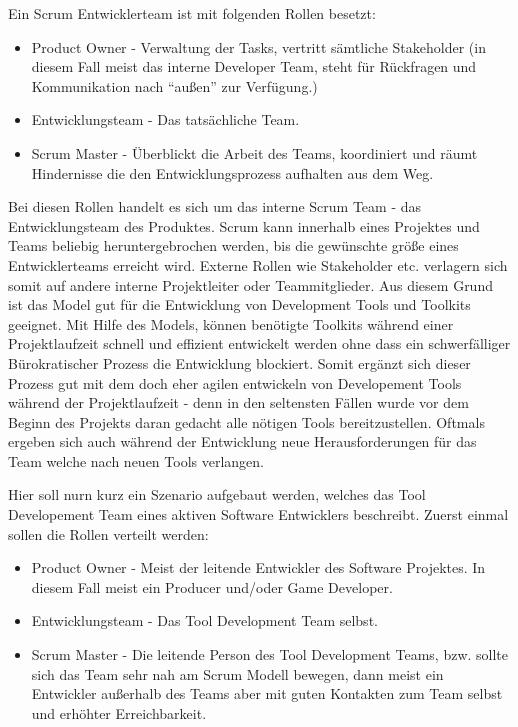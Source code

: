 \documentclass[pagesize, paper=a4, fontsize=12pt, titlepage=true, headings=small, headnosepline, abstractoff, liststotoc, nochapterprefix, plainheadsepline, twoside]{scrreprt}
\begin{document}
Ein Scrum Entwicklerteam ist mit folgenden Rollen besetzt:
\begin{itemize}
\item Product Owner - Verwaltung der Tasks, vertritt sämtliche Stakeholder (in diesem Fall meist das interne Developer Team, steht für Rückfragen und Kommunikation nach “außen” zur Verfügung.)
\item Entwicklungsteam - Das tatsächliche Team.
\item Scrum Master - Überblickt die Arbeit des Teams, koordiniert und räumt Hindernisse die den Entwicklungsprozess aufhalten aus dem Weg.
\end{itemize}

Bei diesen Rollen handelt es sich um das interne Scrum Team - das Entwicklungsteam des Produktes. Scrum kann innerhalb eines Projektes und Teams beliebig heruntergebrochen werden, bis die gewünschte größe eines Entwicklerteams erreicht wird. Externe Rollen wie Stakeholder etc. verlagern sich somit auf andere interne Projektleiter oder Teammitglieder. Aus diesem Grund ist das Model gut für die Entwicklung von Development Tools und Toolkits geeignet. Mit Hilfe des Models, können benötigte Toolkits während einer Projektlaufzeit schnell und effizient entwickelt werden ohne dass ein schwerfälliger Bürokratischer Prozess die Entwicklung blockiert. Somit ergänzt sich dieser Prozess gut mit dem doch eher agilen entwickeln von Developement Tools während der Projektlaufzeit - denn in den seltensten Fällen wurde vor dem Beginn des Projekts daran gedacht alle nötigen Tools bereitzustellen. Oftmals ergeben sich auch während der Entwicklung neue Herausforderungen für das Team welche nach neuen Tools verlangen.

Hier soll nurn kurz ein Szenario aufgebaut werden, welches das Tool Developement Team eines aktiven Software Entwicklers beschreibt. Zuerst einmal sollen die Rollen verteilt werden:

\begin{itemize}
\item Product Owner - Meist der leitende Entwickler des Software Projektes. In diesem Fall meist ein Producer und/oder Game Developer.
\item Entwicklungsteam - Das Tool Development Team selbst.
\item Scrum Master - Die leitende Person des Tool Development Teams, bzw. sollte sich das Team sehr nah am Scrum Modell bewegen, dann meist ein Entwickler außerhalb des Teams aber mit guten Kontakten zum Team selbst und erhöhter Erreichbarkeit.
\end{itemize}
\end{document}
